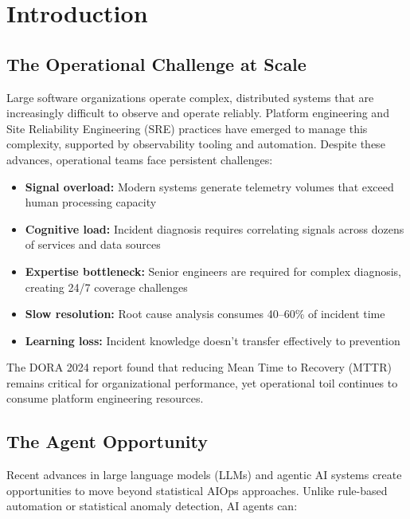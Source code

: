 \chapter{Introduction}
\label{ch:introduction}


\section{The Operational Challenge at Scale}
\label{sec:operational-challenge}

Large software organizations operate complex, distributed systems that are increasingly difficult to observe and operate reliably. Platform engineering and Site Reliability Engineering (SRE) practices have emerged to manage this complexity, supported by observability tooling and automation. Despite these advances, operational teams face persistent challenges:

\begin{itemize}
    \item \textbf{Signal overload:} Modern systems generate telemetry volumes that exceed human processing capacity
    \item \textbf{Cognitive load:} Incident diagnosis requires correlating signals across dozens of services and data sources
    \item \textbf{Expertise bottleneck:} Senior engineers are required for complex diagnosis, creating 24/7 coverage challenges
    \item \textbf{Slow resolution:} Root cause analysis consumes 40--60\% of incident time
    \item \textbf{Learning loss:} Incident knowledge doesn't transfer effectively to prevention
\end{itemize}

The DORA 2024 report found that reducing Mean Time to Recovery (MTTR) remains critical for organizational performance, yet operational toil continues to consume platform engineering resources.

\section{The Agent Opportunity}
\label{sec:agent-opportunity}

Recent advances in large language models (LLMs) and agentic AI systems create opportunities to move beyond statistical AIOps approaches. Unlike rule-based automation or statistical anomaly detection, AI agents can:

